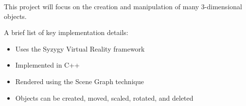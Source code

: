 This project will focus on the creation and manipulation of many 3-dimensional objects.

A brief list of key implementation details: %
\begin{itemize}
	\item Uses the Syzygy Virtual Reality framework
	\item Implemented in C++
	\item Rendered using the Scene Graph technique
	\item Objects can be created, moved, scaled, rotated, and deleted
\end{itemize}
